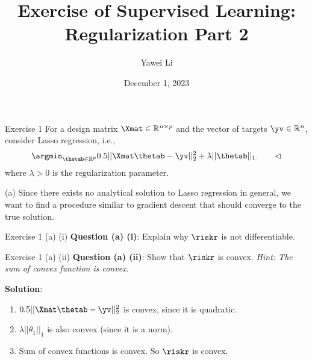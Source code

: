 \documentclass[aspectratio=169]{beamer}
\title[]{\textbf{Exercise of Supervised Learning: \\ Regularization Part 2}}
\author{Yawei Li}
\institute[LMU]
{
\\
  \texttt{yawei.li@stat.uni-muenchen.de}
}
\date{December 1, 2023}
\begin{document}
\begin{frame}
\titlepage

\end{frame}


\begin{frame}{Exercise 1}
	For a design matrix $\Xmat \in \mathbb{R}^{n \times p}$ and the vector of targets $\yv \in \mathbb{R}^n$, consider Lasso regression, i.e., 
	$$\argmin_{\thetab \in \mathbb{R}^p} 0.5 || \Xmat \thetab - \yv ||_2^2 + \lambda ||\thetab||_1. \qquad \lhd$$
	where $\lambda > 0$ is the regularization parameter.
	
	(a) Since there exists no analytical solution to Lasso regression in general, we want to find a procedure similar to gradient descent that should converge to the true solution.
	
	\vspace{10pt}
\end{frame}

\begin{frame}{Exercise 1 (a) (i)}
	\textbf{Question (a) (i)}: Explain why $\riskr$ is not differentiable.
	
	\vspace{10pt}
\end{frame}

\begin{frame}{Exercise 1 (a) (ii)}
	\textbf{Question (a) (ii)}: Show that $\riskr$ is convex. \emph{Hint: The sum of convex function is convex.}
	
	\vspace{10pt} 
	
	\textbf{Solution}: 
		\begin{enumerate}
			\item<2-> $0.5 ||\Xmat \thetab - \yv ||_2^2$ is convex, since it is quadratic.
			\item<3-> $\lambda || \theta_1 ||_1$ is also convex (since it is a norm).
			\item<4-> Sum of convex functions is convex. So $\riskr$ is convex.
		\end{enumerate}
\end{frame}
\end{document}
